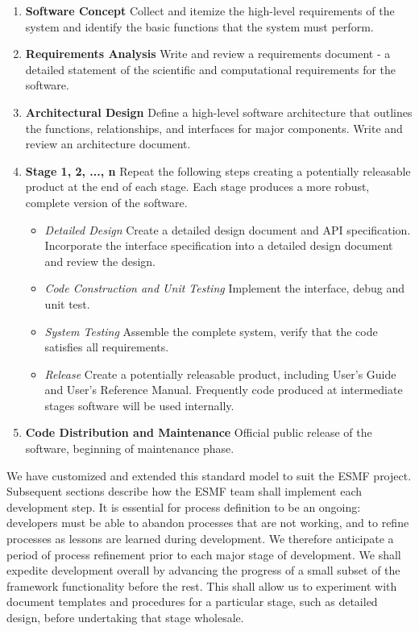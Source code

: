 \begin{enumerate}
\item {\bf Software Concept}  Collect and itemize the high-level requirements of the system and identify the basic functions that the system must perform.

\item {\bf Requirements Analysis} Write and review a requirements document - a detailed statement of the scientific and computational requirements for the software.

\item {\bf Architectural Design} Define a high-level software architecture that outlines the functions, relationships, and interfaces for major components. Write and review an architecture document.

\item {\bf Stage 1, 2, ..., n} Repeat the following steps creating a potentially releasable product at the end of each stage. Each stage produces a more robust, complete version of the software.

\begin{itemize}
\item {\it Detailed Design} Create a detailed design document and API specification. Incorporate the interface specification 
into a detailed design document and review the design.

\item {\it Code Construction and Unit Testing} Implement the interface, 
debug and unit test.

\item {\it System Testing}  Assemble the complete system, verify that the 
code satisfies all requirements.

\item {\it Release} Create a potentially releasable product, including User's Guide and User's Reference Manual. Frequently code produced at intermediate stages software will be used internally.
\end{itemize}

\item {\bf Code Distribution and Maintenance}  Official public release 
of the software, beginning of maintenance phase. 

\end{enumerate}

We have customized and extended this standard model to suit the ESMF project.  
Subsequent sections describe how the ESMF team shall implement each development step.
It is essential for process definition to be an ongoing:  developers must 
be able to abandon processes that are not working, and to refine processes
as lessons are learned during development.  We therefore anticipate a 
period of process refinement prior to each major stage of development.
We shall expedite development overall by advancing the progress of a small 
subset of the framework functionality before the rest.  This shall allow 
us to experiment with document templates and procedures for a particular
stage, such as detailed design, before undertaking that stage wholesale.

